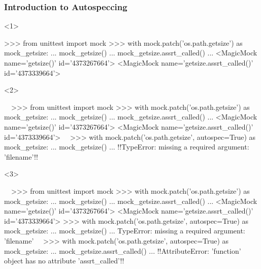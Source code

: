\documentclass[xcolor={svgnames}]{beamer}
\begin{document}
\begin{frame}[t,fragile]
    \frametitle{Introduction to Autospeccing}
    \begin{onlyenv}<1>
        \begin{pyenv}[style=footnotesize,gobble=12]
            >>> from unittest import mock
            >>> with mock.patch('os.path.getsize') as mock_getsize:
            ...     mock_getsize()
            ...     mock_getsize.assrt_called()
            ...
            <MagicMock name='getsize()' id='4373267664'>
            <MagicMock name='getsize.assrt_called()' id='4373339664'>
        \end{pyenv}
    \end{onlyenv}
    \begin{onlyenv}<2>
        \begin{pyenv}[style=footnotesize,gobble=12]
            ~~>>> from unittest import mock
            >>> with mock.patch('os.path.getsize') as mock_getsize:
            ...     mock_getsize()
            ...     mock_getsize.assrt_called()
            ...
            <MagicMock name='getsize()' id='4373267664'>
            <MagicMock name='getsize.assrt_called()' id='4373339664'>~~
            >>> with mock.patch('os.path.getsize', autospec=True) as mock_getsize:
            ...     mock_getsize()
            ...
            !!TypeError: missing a required argument: 'filename'!!
        \end{pyenv}
    \end{onlyenv}
    \begin{onlyenv}<3>
        \begin{pyenv}[style=footnotesize,gobble=12]
            ~~>>> from unittest import mock
            >>> with mock.patch('os.path.getsize') as mock_getsize:
            ...     mock_getsize()
            ...     mock_getsize.assrt_called()
            ...
            <MagicMock name='getsize()' id='4373267664'>
            <MagicMock name='getsize.assrt_called()' id='4373339664'>
            >>> with mock.patch('os.path.getsize', autospec=True) as mock_getsize:
            ...     mock_getsize()
            ...
            TypeError: missing a required argument: 'filename'~~
            >>> with mock.patch('os.path.getsize', autospec=True) as mock_getsize:
            ...     mock_getsize.assrt_called()
            ...
            !!AttributeError: 'function' object has no attribute 'assrt_called'!!
        \end{pyenv}
    \end{onlyenv}

\end{frame}
\end{document}
